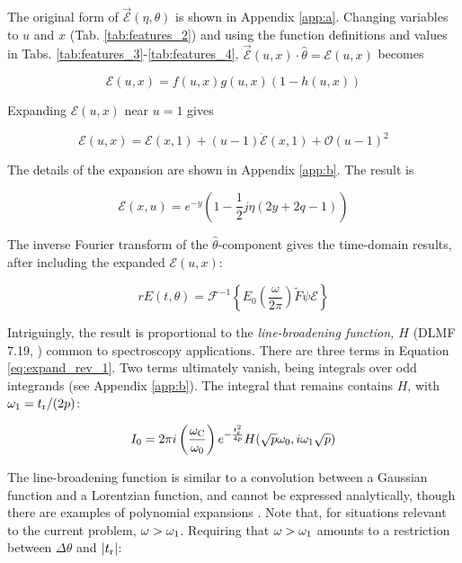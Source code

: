 \documentclass[amsmath,amssymb,aps,prd,10pt,twocolumn]{revtex4}
\begin{document}
The original form of $\vec{\mathcal{E}}(\eta,\theta)$ is shown in Appendix \ref{app:a}.  Changing variables to $u$ and $x$ (Tab. \ref{tab:features_2}) and using the function definitions and values in Tabs. \ref{tab:features_3}-\ref{tab:features_4}, $\vec{\mathcal{E}}(u,x) \cdot \hat{\theta} = \mathcal{E}(u,x)$ becomes

\begin{equation}
\mathcal{E}(u,x) = f(u,x) g(u,x) (1 - h(u,x))
\end{equation}

Expanding $\mathcal{E}(u,x)$ near $u = 1$ gives

\begin{equation}
\mathcal{E}(u,x) = \mathcal{E}(x,1) + (u-1) \dot{\mathcal{E}}(x,1) + \mathcal{O}(u-1)^2 \label{eq:expand}
\end{equation}

The details of the expansion are shown in Appendix \ref{app:b}.  The result is

\begin{equation}
\mathcal{E}(x,u) = e^{-y} \left( 1 - \frac{1}{2} j\eta\left( 2y + 2q - 1 \right) \right) \label{eq:expand_rev_1}
\end{equation}

The inverse Fourier transform of the $\hat{\theta}$-component gives the time-domain results, after including the expanded $\mathcal{E}(u,x)$:

\begin{equation}
r E(t,\theta) = \mathcal{F}^{-1} \left\lbrace E_0 \left(\frac{\omega}{2\pi}\right) \widetilde{F} \psi \mathcal{E} \right\rbrace
\end{equation}

Intriguingly, the result is proportional to the \textit{line-broadening function, $H$} (DLMF 7.19, \cite{NIST:DLMF}) common to spectroscopy applications.  There are three terms in Equation \ref{eq:expand_rev_1}.  Two terms ultimately vanish, being integrals over odd integrands (see Appendix \ref{app:b}).  The integral that remains contains $H$, with $\omega_{\rm 1} = t_{\rm r}/(2p)$:

\begin{equation}
I_{\rm 0} = 2 \pi i \left( \frac{\omega_{\rm C}}{\omega_{\rm 0}} \right) e^{- \frac{t_{\rm r}^2}{4p}} H(\sqrt{p}\omega_0,i\omega_1\sqrt{p})
\end{equation}

The line-broadening function is similar to a convolution between a Gaussian function and a Lorentzian function, and cannot be expressed analytically, though there are examples of polynomial expansions \cite{10.1111/j.1365-2966.2006.10450.x}.  Note that, for situations relevant to the current problem, $\omega > \omega_{\rm 1}$.  Requiring that $\omega > \omega_{\rm 1}$ amounts to a restriction between $\Delta\theta$ and $|t_{\rm r}|$:
\end{document}
